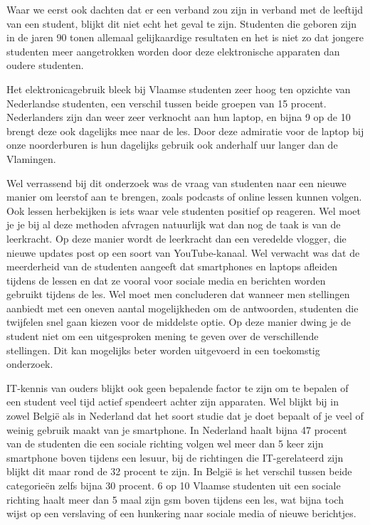 Waar we eerst ook dachten dat er een verband zou zijn in verband met de leeftijd van een student, blijkt dit niet echt het geval te zijn. Studenten die geboren zijn in de jaren 90 tonen allemaal gelijkaardige resultaten en het is niet zo dat jongere studenten meer aangetrokken worden door deze elektronische apparaten dan oudere studenten.

Het elektronicagebruik bleek bij Vlaamse studenten zeer hoog ten opzichte van Nederlandse studenten, een verschil tussen beide groepen van 15 procent. Nederlanders zijn dan weer zeer verknocht aan hun laptop, en bijna 9 op de 10 brengt deze ook dagelijks mee naar de les. Door deze admiratie voor de laptop bij onze noorderburen is hun dagelijks gebruik ook anderhalf uur langer dan de Vlamingen. 

Wel verrassend bij dit onderzoek was de vraag van studenten naar een nieuwe manier om leerstof aan te brengen, zoals podcasts of online lessen kunnen volgen. Ook lessen herbekijken is iets waar vele studenten positief op reageren. Wel moet je je bij al deze methoden afvragen natuurlijk wat dan nog de taak is van de leerkracht. Op deze manier wordt de leerkracht dan een veredelde vlogger, die nieuwe updates post op een soort van YouTube-kanaal. Wel verwacht was dat de meerderheid van de studenten aangeeft dat smartphones en laptops afleiden tijdens de lessen en dat ze vooral voor sociale media en berichten worden gebruikt tijdens de les. Wel moet men concluderen dat wanneer men stellingen aanbiedt met een oneven aantal mogelijkheden om de antwoorden, studenten die twijfelen snel gaan kiezen voor de middelste optie. Op deze manier dwing je de student niet om een uitgesproken mening te geven over de verschillende stellingen. Dit kan mogelijks beter worden uitgevoerd in een toekomstig onderzoek.

IT-kennis van ouders blijkt ook geen bepalende factor te zijn om te bepalen of een student veel tijd actief spendeert achter zijn apparaten. Wel blijkt bij in zowel België als in Nederland dat het soort studie dat je doet bepaalt of je veel of weinig gebruik maakt van je smartphone. In Nederland haalt bijna 47 procent van de studenten die een sociale richting volgen wel meer dan 5 keer zijn smartphone boven tijdens een lesuur, bij de richtingen die IT-gerelateerd zijn blijkt dit maar rond de 32 procent te zijn. In België is het verschil tussen beide categorieën zelfs bijna 30 procent. 6 op 10 Vlaamse studenten uit een sociale richting haalt meer dan 5 maal zijn gsm boven tijdens een les, wat bijna toch wijst op een verslaving of een hunkering naar sociale media of nieuwe berichtjes.

